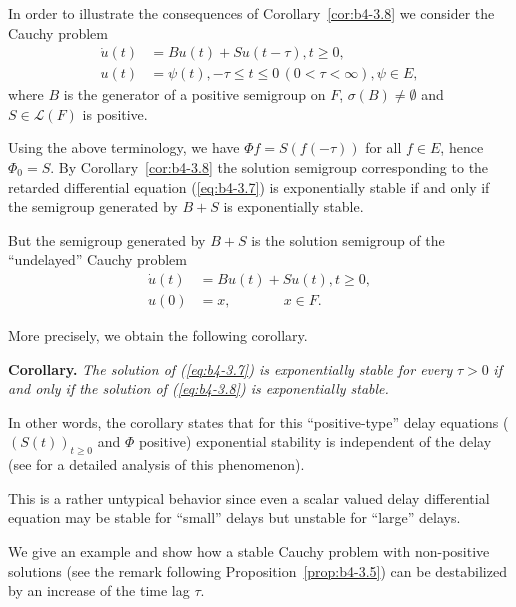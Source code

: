 \begin{example}\label{ex:b4-3.10}
	In order to illustrate the consequences of Corollary~\ref{cor:b4-3.8} we consider the Cauchy problem
	\begin{equation}\label{eq:b4-3.7}
		\begin{aligned}
		\dot{u}(t) &= Bu(t) + Su(t-\tau) , t \geq 0 ,\\
		u(t) &= \psi(t) , -\tau \leq t \leq 0 \,(0 < \tau < \infty) , \psi \in E ,
		\end{aligned}
	\end{equation}
	where $B$ is the generator of a positive semigroup on $F$, $\sigma(B) \neq \emptyset$ and $S \in \mathcal{L}(F)$ is positive.
	
	Using the above terminology, we have $\Phi f = S(f(-\tau))$ for all $f \in E$, hence $\Phi_{0} = S$. 
	By Corollary~\ref{cor:b4-3.8} the solution semigroup corresponding to the retarded differential equation (\ref{eq:b4-3.7}) is exponentially stable if and only if the semigroup generated by $B + S$ is exponentially stable.
	
	But the semigroup generated by $B + S$ is the solution semigroup of the \enquote{undelayed} Cauchy problem
	\begin{equation}\label{eq:b4-3.8}
	\begin{aligned}
		\dot{u}(t) &= Bu(t) + Su(t) , t \geq 0 ,\\
		u(0) &= x , \quad\quad\quad\;\;\, x \in F.
	\end{aligned}
	\end{equation}
\end{example}
More precisely, we obtain the following corollary.

\medskip\noindent
\textbf{Corollary.}
		\textit{The solution of (\ref{eq:b4-3.7}) is exponentially stable for every} $\tau > 0$ \textit{if and only if the solution of (\ref{eq:b4-3.8}) is exponentially stable.}

\medskip	
In other words, the corollary states that for this \enquote{positive-type} delay equations ($(S(t))_{t\geq0}$ and $\Phi$ positive) exponential stability is independent of the delay (see \citet{kerscher:1986} for a detailed analysis of this phenomenon).
	
	This is a rather untypical behavior since even a scalar valued delay differential equation may be stable for \enquote{small} delays but unstable for \enquote{large} delays.
	
	We give an example and show how a stable Cauchy problem with non-positive solutions (see the remark following Proposition~\ref{prop:b4-3.5}) can be destabilized by an increase of the time lag $\tau$.
	
